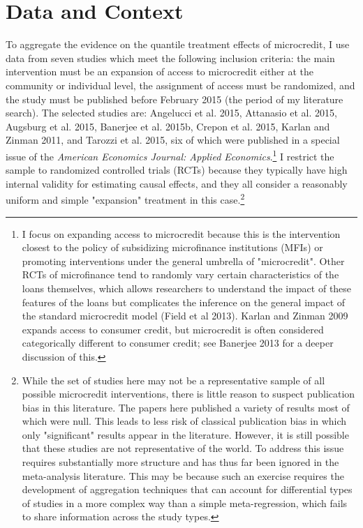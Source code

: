 \documentclass[english,12pt]{article}\usepackage{lmodern}
\numberwithin{equation}{section}
\begin{document}
\section{Data and Context}


To aggregate the evidence on the quantile treatment effects of microcredit, I use data from seven studies which meet the following inclusion criteria: the main intervention must be an expansion of access to microcredit either at the community or individual level, the assignment of access must be randomized, and the study must be published before February 2015 (the period of my literature search). The selected studies are: Angelucci et al. 2015, Attanasio et al. 2015, Augsburg et al. 2015, Banerjee et al. 2015b, Crepon et al. 2015, Karlan and Zinman 2011, and Tarozzi et al. 2015, six of which were published in a special issue of the \emph{American Economics Journal: Applied Economics}.\footnote{I focus on expanding access to microcredit because this is the intervention closest to the policy of subsidizing microfinance institutions (MFIs) or promoting interventions under the general umbrella of "microcredit". Other RCTs of microfinance tend to randomly vary certain characteristics of the loans themselves, which allows researchers to understand the impact of these features of the loans but complicates the inference on the general impact of the standard microcredit model (Field et al 2013). Karlan and Zinman 2009 expands access to consumer credit, but microcredit is often considered categorically different to consumer credit; see Banerjee 2013 for a deeper discussion of this.} I restrict the sample to randomized controlled trials (RCTs) because they typically have high internal validity for estimating causal effects, and they all consider a reasonably uniform and simple "expansion" treatment in this case.\footnote{While the set of studies here may not be a representative sample of all possible microcredit interventions, there is little reason to suspect publication bias in this literature. The papers here published a variety of results most of which were null. This leads to less risk of classical publication bias in which only "significant" results appear in the literature. However, it is still possible that these studies are not representative of the world. To address this issue requires substantially more structure and has thus far been ignored in the meta-analysis literature. This may be because such an exercise requires the development of aggregation techniques that can account for differential types of studies in a more complex way than a simple meta-regression, which fails to share information across the study types.}
\end{document}
